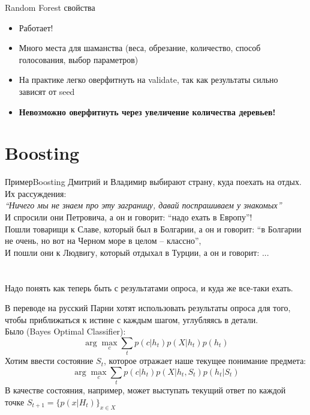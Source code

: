 \documentclass[14pt, fleqn, xcolor={dvipsnames, table}]{beamer}
\begin{document}
\begin{frame}{Random Forest свойства}{}
\begin{itemize}
  \item Работает!
  \item Много места для шаманства (веса, обрезание, количество, способ голосования, выбор параметров)
  \item На практике легко оверфитнуть на validate, так как результаты сильно зависят от seed
  \item \textbf{Невозможно оверфитнуть через увеличение количества деревьев!}
\end{itemize}
\end{frame}

\section{Boosting}

\begin{frame}{Пример}{Boosting}
\small
Дмитрий и Владимир выбирают страну, куда поехать на отдых. Их рассуждения: \\
\textit{``Ничего мы не знаем про эту заграницу, давай поспрашиваем у знакомых''} \\{\footnotesize
И спросили они Петровича, а он и говорит: ``надо ехать в Европу''! \\
Пошли товарищи к Славе, который был в Болгарии, а он и говорит: ``в Болгарии не очень, но вот на Черном море в целом -- классно'', \\
И пошли они к Людвигу, который отдыхал в Турции, а он и говорит: ...\\
}
~\\
~\\
Надо понять как теперь быть с результатами опроса, и куда же все-таки ехать.
\end{frame}

\begin{frame}{В переводе на русский}
\small
Парни хотят использовать результаты опроса для того, чтобы приближаться к истине с каждым шагом, углубляясь в детали. \\
Было (Bayes Optimal Classifier):
$$
\arg \max_c \sum_t p(c|h_t) p(X | h_t) p(h_t) 
$$
Хотим ввести состояние $S_t$, которое отражает наше текущее понимание предмета:
$$
\arg \max_c \sum_t p(c|h_t) p(X | h_t, S_t) p(h_t|S_t) 
$$
В качестве состояния, например, может выступать текущий ответ по каждой точке $S_{t+1} = \{p(x| H_t)\}_{x \in X}$
\end{frame}
\end{document}
